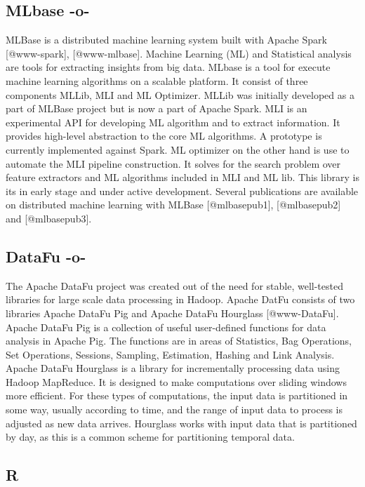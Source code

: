 \subsection{MLbase -o-}
    
MLBase is a distributed machine learning system built with Apache
Spark [@www-spark], [@www-mlbase].  Machine Learning (ML) and
Statistical analysis are tools for extracting insights from big data.
MLbase is a tool for execute machine learning algorithms on a scalable
platform. It consist of three components MLLib, MLI and ML
Optimizer. MLLib was initially developed as a part of MLBase project
but is now a part of Apache Spark. MLI is an experimental API for
developing ML algorithm and to extract information. It provides
high-level abstraction to the core ML algorithms. A prototype is
currently implemented against Spark. ML optimizer on the other hand is
use to automate the MLI pipeline construction. It solves for the
search problem over feature extractors and ML algorithms included in
MLI and ML lib. This library is its in early stage and under active
development. Several publications are available on distributed machine
learning with MLBase [@mlbasepub1], [@mlbasepub2]
and [@mlbasepub3].




\subsection{DataFu -o-}

The Apache DataFu project was created out of the need for stable,
well-tested libraries for large scale data processing in Hadoop.
Apache DatFu consists of two libraries Apache DataFu Pig and Apache
DataFu Hourglass [@www-DataFu]. Apache DataFu Pig is a collection
of useful user-defined functions for data analysis in Apache Pig. The
functions are in areas of Statistics, Bag Operations, Set Operations,
Sessions, Sampling, Estimation, Hashing and Link Analysis.  Apache
DataFu Hourglass is a library for incrementally processing data using
Hadoop MapReduce. It is designed to make computations over sliding
windows more efficient. For these types of computations, the input
data is partitioned in some way, usually according to time, and the
range of input data to process is adjusted as new data arrives.
Hourglass works with input data that is partitioned by day, as this is
a common scheme for partitioning temporal data.



\subsection{R}

